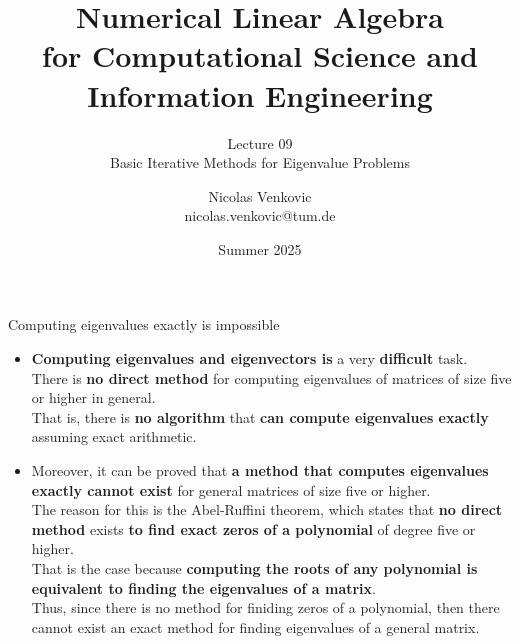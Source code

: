 \documentclass[t,usepdftitle=false]{beamer}
\title[NLA for CS and IE -- Lecture 09]{Numerical Linear Algebra\\for Computational Science and Information Engineering}
\subtitle{\vspace{.3cm}Lecture 09\\Basic Iterative Methods for Eigenvalue Problems}
\date[Summer 2025]{Summer 2025}
\author[nicolas.venkovic@tum.de]{Nicolas Venkovic\\{\small nicolas.venkovic@tum.de}}
\institute[]{Group of Computational Mathematics\\School of Computation, Information and Technology\\Technical University of Munich}
\begin{document}
	
\begin{frame}
	\maketitle
\end{frame}
	
\myoutlineframe

\begin{frame}{Computing eigenvalues exactly is impossible}
\begin{itemize}
\item \textbf{Computing eigenvalues and eigenvectors is} a very \textbf{difficult} task.\vspace{.1cm}\\
There is \textbf{no direct method} for computing eigenvalues of matrices of size five or higher in general.\vspace{.1cm}\\
That is, there is \textbf{no algorithm} that \textbf{can compute eigenvalues exactly} assuming exact arithmetic.
\item Moreover, it can be proved that \textbf{a method that computes eigenvalues exactly cannot exist} for general matrices of size five or higher.\vspace{.1cm}\\
The reason for this is the Abel-Ruffini theorem, which states that \textbf{no direct method} exists \textbf{to find exact zeros of a polynomial} of degree five or higher.\vspace{.1cm}\\
That is the case because \textbf{computing the roots of any polynomial is equivalent to finding the eigenvalues of a matrix}.\vspace{.1cm}\\
Thus, since there is no method for finiding zeros of a polynomial, then there cannot exist an exact method for finding eigenvalues of a general matrix.
\end{itemize}
\end{frame}
\end{document}
